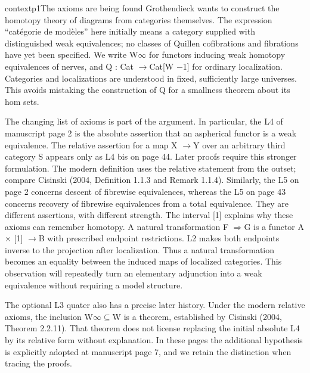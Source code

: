 \begin{dcomment}{context}{p1}{The axioms are being found}
Grothendieck wants to construct the homotopy theory of diagrams from categories themselves. The expression “catégorie de modèles” here initially means a category supplied with distinguished weak equivalences; no classes of Quillen cofibrations and fibrations have yet been specified. We write W\ensuremath{\infty} for functors inducing weak homotopy equivalences of nerves, and Q : Cat \ensuremath{\to}Cat[W \ensuremath{-}1] for ordinary localization. Categories and localizations are understood in fixed, sufficiently large universes. This avoids mistaking the construction of Q for a smallness theorem about its hom sets.

The changing list of axioms is part of the argument. In particular, the L4 of manuscript page 2 is the absolute assertion that an aspherical functor is a weak equivalence. The relative assertion for a map X \ensuremath{\to}Y over an arbitrary third category S appears only as L4 bis on page 44. Later proofs require this stronger formulation. The modern definition uses the relative statement from the outset; compare Cisinski (2004, Definition 1.1.3 and Remark 1.1.4). Similarly, the L5 on page 2 concerns descent of fibrewise equivalences, whereas the L5 on page 43 concerns recovery of fibrewise equivalences from a total equivalence. They are different assertions, with different strength. The interval [1] explains why these axioms can remember homotopy. A natural transformation F \ensuremath{\Rightarrow}G is a functor A \ensuremath{\times} [1] \ensuremath{\to}B with prescribed endpoint restrictions. L2 makes both endpoints inverse to the projection after localization. Thus a natural transformation becomes an equality between the induced maps of localized categories. This observation will repeatedly turn an elementary adjunction into a weak equivalence without requiring a model structure.

The optional L3 quater also has a precise later history. Under the modern relative axioms, the inclusion W\ensuremath{\infty}\ensuremath{\subseteq}W is a theorem, established by Cisinski (2004, Theorem 2.2.11). That theorem does not license replacing the initial absolute L4 by its relative form without explanation. In these pages the additional hypothesis is explicitly adopted at manuscript page 7, and we retain the distinction when tracing the proofs.

\end{dcomment}

